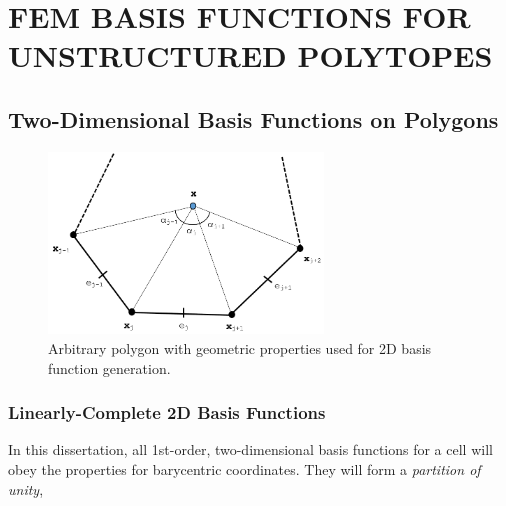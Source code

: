 %
%
%
\chapter{\uppercase {FEM Basis Functions for Unstructured Polytopes}}
\label{sec::BF}

\section{Two-Dimensional Basis Functions on Polygons}
\label{sec::BF_2D}



\begin{figure}[hbt]
\centering
\includegraphics[width=0.65\textwidth]{figures/sec_BF/ref_polygon.png}
\caption{Arbitrary polygon with geometric properties used for 2D basis function generation.}
\label{fig::BF_2D_ref_polygon}
\end{figure}

\subsection{Linearly-Complete 2D Basis Functions}
\label{sec::BF_2D_Linear}

In this dissertation, all 1st-order, two-dimensional basis functions for a cell will obey the properties for barycentric coordinates. They will form a {\em partition of unity},

